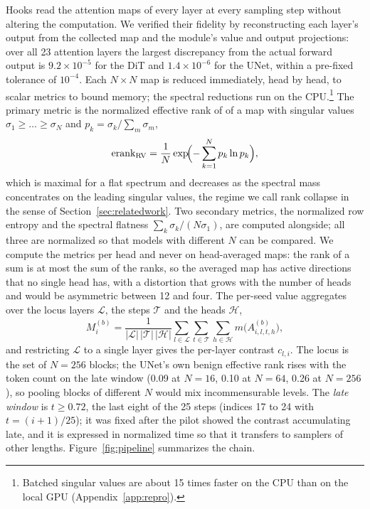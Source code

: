 \documentclass{article}
\begin{document}
Hooks read the attention maps of every layer at every sampling step without altering the computation. We verified their fidelity by reconstructing each layer's output from the collected map and the module's value and output projections: over all 23 attention layers the largest discrepancy from the actual forward output is $9.2{\times}10^{-5}$ for the DiT and $1.4{\times}10^{-6}$ for the UNet, within a pre-fixed tolerance of $10^{-4}$. Each $N{\times}N$ map is reduced immediately, head by head, to scalar metrics to bound memory; the spectral reductions run on the CPU.\footnote{Batched singular values are about 15 times faster on the CPU than on the local GPU (Appendix~\ref{app:repro}).} The primary metric is the normalized effective rank of \citet{roy2007effective} of a map with singular values $\sigma_1 \ge \dots \ge \sigma_N$ and $p_k = \sigma_k / \sum_m \sigma_m$,
\begin{equation}\label{eq:erank}
  \mathrm{erank}_{\mathrm{RV}} = \frac{1}{N}\exp\!\Bigl(-\sum_{k=1}^{N} p_k \ln p_k\Bigr),
\end{equation}
which is maximal for a flat spectrum and decreases as the spectral mass concentrates on the leading singular values, the regime we call rank collapse in the sense of Section~\ref{sec:relatedwork}. Two secondary metrics, the normalized row entropy and the spectral flatness $\sum_k \sigma_k / (N \sigma_1)$, are computed alongside; all three are normalized so that models with different $N$ can be compared. We compute the metrics per head and never on head-averaged maps: the rank of a sum is at most the sum of the ranks, so the averaged map has active directions that no single head has, with a distortion that grows with the number of heads and would be asymmetric between 12 and four. The per-seed value aggregates over the locus layers $\mathcal{L}$, the steps $\mathcal{T}$ and the heads $\mathcal{H}$,
\begin{equation}\label{eq:aggregation}
  M_i^{(b)} = \frac{1}{|\mathcal{L}|\,|\mathcal{T}|\,|\mathcal{H}|} \sum_{l \in \mathcal{L}} \sum_{t \in \mathcal{T}} \sum_{h \in \mathcal{H}} m\bigl(A^{(b)}_{i,l,t,h}\bigr),
\end{equation}
and restricting $\mathcal{L}$ to a single layer gives the per-layer contrast $c_{l,i}$. The locus is the set of $N{=}256$ blocks; the UNet's own benign effective rank rises with the token count on the late window (0.09 at $N{=}16$, 0.10 at $N{=}64$, 0.26 at $N{=}256$), so pooling blocks of different $N$ would mix incommensurable levels. The \textit{late window} is $t \ge 0.72$, the last eight of the 25 steps (indices 17 to 24 with $t = (i+1)/25$); it was fixed after the pilot showed the contrast accumulating late, and it is expressed in normalized time so that it transfers to samplers of other lengths. Figure~\ref{fig:pipeline} summarizes the chain.
\end{document}
